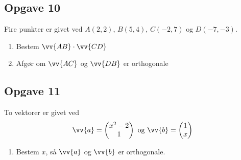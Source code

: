 \subsection*{Opgave 10}

Fire punkter er givet ved $A(2,2)$, $B(5,4)$, $C(-2,7)$ og $D(-7,-3)$.
\begin{enumerate}[label=\roman*)]
	\item Bestem $\vv{AB}\cdot \vv{CD}$
	\item Afgør om $\vv{AC}$ og $\vv{DB}$ er orthogonale
\end{enumerate}

\subsection*{Opgave 11}

To vektorer er givet ved
\begin{align*}
	\vv{a} = 
	\begin{pmatrix}
		x^2 - 2 \\
		1	
	\end{pmatrix}
	\textnormal{ og }
	\vv{b} = 
	\begin{pmatrix}
		1 \\
		x
	\end{pmatrix}
\end{align*}
\begin{enumerate}[label = \roman*)]
	\item Bestem $x$, så $\vv{a}$ og $\vv{b}$ er orthogonale.
\end{enumerate}
